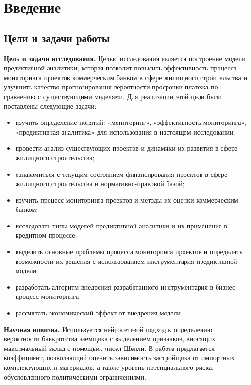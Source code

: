 \documentclass[12pt,a4paper]{article} %
\begin{document}
\newpage
\tableofcontents
 


\newpage
\section{Введение}


 

\newpage
\subsection{Цели и задачи работы}

\textbf{Цель и задачи исследования.} Целью исследования является построение модели предиктивной аналитики, которая позволит повысить эффективность процесса мониторинга проектов коммерческим банком в сфере жилищного строительства и улучшить качество прогнозирования вероятности просрочки платежа по сравнению с существующими моделями. Для реализации этой цели были поставлены следующие задачи:
\begin{itemize}
	\item изучить определение понятий: «мониторинг», «эффективность мониторинга», «предиктивная аналитика» для использования в настоящем исследовании;
	\item провести анализ существующих проектов и динамики их развития в сфере жилищного строительства;
	\item ознакомиться с текущим состоянием финансирования проектов в сфере жилищного строительства и нормативно-правовой базой;
	\item изучить процесс мониторинга проектов и методы их оценки коммерческим банком;
	\item исследовать типы моделей предиктивной аналитики и их применение в кредитном процессе;
	\item выделить основные проблемы процесса мониторинга проектов и определить возможности их решения с использованием инструментария предиктивной модели 
	\item разработать алгоритм внедрения разработанного инструментария в бизнес-процесс мониторинга
	\item рассчитать экономический эффект от внедрения модели 
\end{itemize}

\bigskip

\textbf{Научная новизна.} Используется нейросетевой подход к определению вероятности банкротства заемщика с выделением признаков, вносящих максимальный вклад с помощью, чисел Шепли. В работе предлагается коэффициент, позволяющий оценить зависимость застройщика от импортных комплектующих и материалов, а также уровень потенциального риска, обусловленного политическими ограничениями.
\end{document}
